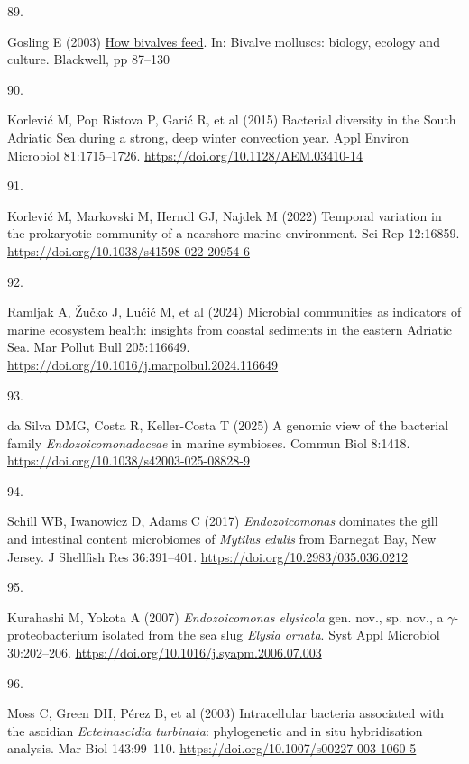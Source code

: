 \documentclass[
  12 pt,
]{article}
\newlength{\cslhangindent}
\newlength{\csllabelwidth}
\newenvironment{CSLReferences}[2] %
 {\begin{list}{}{%
  \setlength{\itemindent}{0pt}
  \setlength{\leftmargin}{0pt}
  \setlength{\parsep}{0pt}
  \ifodd #1
   \setlength{\leftmargin}{\cslhangindent}
   \setlength{\itemindent}{-1\cslhangindent}
  \fi
  \setlength{\itemsep}{#2\baselineskip}}}
 {\end{list}}
\newcommand{\CSLLeftMargin}[1]{\parbox[t]{\csllabelwidth}{\strut#1\strut}}
\newcommand{\CSLRightInline}[1]{\parbox[t]{\linewidth - \csllabelwidth}{\strut#1\strut}}
\begin{document}
\begin{CSLReferences}{0}{0}
\CSLLeftMargin{89. }%
\CSLRightInline{Gosling E (2003) \href{https://doi.org/10.1002/9780470995532.ch4}{How bivalves feed}. In: Bivalve molluscs: biology, ecology and culture. Blackwell, pp 87--130}

\CSLLeftMargin{90. }%
\CSLRightInline{Korlević M, Pop Ristova P, Garić R, et al (2015) Bacterial diversity in the {South Adriatic Sea} during a strong, deep winter convection year. Appl Environ Microbiol 81:1715--1726. \url{https://doi.org/10.1128/AEM.03410-14}}

\CSLLeftMargin{91. }%
\CSLRightInline{Korlević M, Markovski M, Herndl GJ, Najdek M (2022) Temporal variation in the prokaryotic community of a nearshore marine environment. Sci Rep 12:16859. \url{https://doi.org/10.1038/s41598-022-20954-6}}

\CSLLeftMargin{92. }%
\CSLRightInline{Ramljak A, Žučko J, Lučić M, et al (2024) Microbial communities as indicators of marine ecosystem health: insights from coastal sediments in the eastern {Adriatic Sea}. Mar Pollut Bull 205:116649. \url{https://doi.org/10.1016/j.marpolbul.2024.116649}}

\CSLLeftMargin{93. }%
\CSLRightInline{da Silva DMG, Costa R, Keller-Costa T (2025) A genomic view of the bacterial family {{\emph{Endozoicomonadaceae}}} in marine symbioses. Commun Biol 8:1418. \url{https://doi.org/10.1038/s42003-025-08828-9}}

\CSLLeftMargin{94. }%
\CSLRightInline{Schill WB, Iwanowicz D, Adams C (2017) {\emph{Endozoicomonas}} dominates the gill and intestinal content microbiomes of {{\emph{Mytilus}}}{\emph{ edulis}} from {Barnegat Bay}, {New Jersey}. J Shellfish Res 36:391--401. \url{https://doi.org/10.2983/035.036.0212}}

\CSLLeftMargin{95. }%
\CSLRightInline{Kurahashi M, Yokota A (2007) {\emph{Endozoicomonas elysicola}} gen. nov., sp. nov., a \(\gamma\)-proteobacterium isolated from the sea slug {{\emph{Elysia}}}{\emph{ ornata}}. Syst Appl Microbiol 30:202--206. \url{https://doi.org/10.1016/j.syapm.2006.07.003}}

\CSLLeftMargin{96. }%
\CSLRightInline{Moss C, Green DH, Pérez B, et al (2003) Intracellular bacteria associated with the ascidian {{\emph{Ecteinascidia turbinata}}}: phylogenetic and in situ hybridisation analysis. Mar Biol 143:99--110. \url{https://doi.org/10.1007/s00227-003-1060-5}}


\end{CSLReferences}
\end{document}
